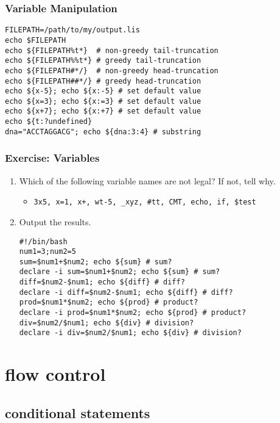 \documentclass[red]{beamer}
\begin{document}
\begin{CJK*}{UTF8}{gbsn}
\begin{frame}
\frametitle{Variable Manipulation}
\begin{block}{}
\begin{lstlisting}
FILEPATH=/path/to/my/output.lis
echo $FILEPATH
echo ${FILEPATH%t*}  # non-greedy tail-truncation
echo ${FILEPATH%%t*} # greedy tail-truncation
echo ${FILEPATH#*/}  # non-greedy head-truncation
echo ${FILEPATH##*/} # greedy head-truncation
echo ${x-5}; echo ${x:-5} # set default value
echo ${x=3}; echo ${x:=3} # set default value
echo ${x+7}; echo ${x:+7} # set default value
echo ${t:?undefined}
dna="ACCTAGGACG"; echo ${dna:3:4} # substring
\end{lstlisting}
\end{block}
\end{frame}


\begin{frame}
\frametitle{Exercise: Variables}
\begin{enumerate}
	\item Which of the following variable names are not legal? If not, tell why.
	\begin{itemize}
		\item \lstinline{3x5, x=1, x+, wt-5, _xyz, #tt, CMT, echo, if, $test}
	\end{itemize}
	\vspace{0.2in}	
	\item Output the results.
	\begin{lstlisting}
#!/bin/bash
num1=3;num2=5
sum=$num1+$num2; echo ${sum} # sum?
declare -i sum=$num1+$num2; echo ${sum} # sum?
diff=$num2-$num1; echo ${diff} # diff?
declare -i diff=$num2-$num1; echo ${diff} # diff?
prod=$num1*$num2; echo ${prod} # product?
declare -i prod=$num1*$num2; echo ${prod} # product?
div=$num2/$num1; echo ${div} # division?
declare -i div=$num2/$num1; echo ${div} # division?
	\end{lstlisting}
\end{enumerate}
\end{frame}

\section{flow control}

\subsection{conditional statements}


\end{CJK*}
\end{document}

